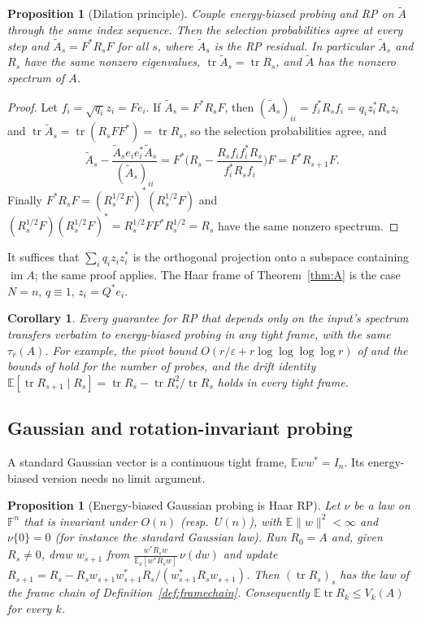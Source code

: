 \documentclass[11pt,a4paper]{article}
\newtheorem{proposition}[theorem]{Proposition}
\newtheorem{corollary}[theorem]{Corollary}
\theoremstyle{definition}
\newcommand{\E}{\mathbb{E}}
\newcommand{\F}{\mathbb{F}}
\newcommand{\tr}{\operatorname{tr}}
\begin{document}
\begin{proposition}[Dilation principle]\label{prop:dilation}
Couple energy-biased probing and RP on $\widetilde A$ through the same index sequence. Then the selection probabilities agree at every step and $\widetilde A_s=F^*R_sF$ for all $s$, where $\widetilde A_s$ is the RP residual. In particular $\widetilde A_s$ and $R_s$ have the same nonzero eigenvalues, $\tr\widetilde A_s=\tr R_s$, and $\widetilde A$ has the nonzero spectrum of $A$.
\end{proposition}

\begin{proof}
Let $f_i=\sqrt{q_i}z_i=Fe_i$. If $\widetilde A_s=F^*R_sF$, then $(\widetilde A_s)_{ii}=f_i^*R_sf_i=q_iz_i^*R_sz_i$ and $\tr\widetilde A_s=\tr(R_sFF^*)=\tr R_s$, so the selection probabilities agree, and
\[
\widetilde A_s-\frac{\widetilde A_se_ie_i^*\widetilde A_s}{(\widetilde A_s)_{ii}}=F^*\Big(R_s-\frac{R_sf_if_i^*R_s}{f_i^*R_sf_i}\Big)F=F^*R_{s+1}F .
\]
Finally $F^*R_sF=(R_s^{1/2}F)^*(R_s^{1/2}F)$ and $(R_s^{1/2}F)(R_s^{1/2}F)^*=R_s^{1/2}FF^*R_s^{1/2}=R_s$ have the same nonzero spectrum.
\end{proof}

It suffices that $\sum_iq_iz_iz_i^*$ is the orthogonal projection onto a subspace containing $\operatorname{im}A$; the same proof applies. The Haar frame of Theorem~\ref{thm:A} is the case $N=n$, $q\equiv1$, $z_i=Q^*e_i$.

\begin{corollary}\label{cor:transfer}
Every guarantee for RP that depends only on the input's spectrum transfers verbatim to energy-biased probing in any tight frame, with the same $\tau_r(A)$. For example, the pivot bound $O(r/\varepsilon+r\log\log\log\log r)$ of \cite{IterLog} and the bounds of \cite{CETW} hold for the number of probes, and the drift identity $\E[\tr R_{s+1}\mid R_s]=\tr R_s-\tr R_s^2/\tr R_s$ holds in every tight frame.
\end{corollary}

\subsection{Gaussian and rotation-invariant probing}
A standard Gaussian vector is a continuous tight frame, $\E ww^*=I_n$. Its energy-biased version needs no limit argument.

\begin{proposition}[Energy-biased Gaussian probing is Haar RP]\label{prop:gaussprobe}
Let $\nu$ be a law on $\F^n$ that is invariant under $O(n)$ (resp.\ $U(n)$), with $\E\|w\|^2<\infty$ and $\nu\{0\}=0$ (for instance the standard Gaussian law). Run $R_0=A$ and, given $R_s\ne0$, draw $w_{s+1}$ from $\frac{w^*R_sw}{\E_\nu[w^*R_sw]}\,\nu(dw)$ and update $R_{s+1}=R_s-R_sw_{s+1}w_{s+1}^*R_s/(w_{s+1}^*R_sw_{s+1})$. Then $(\tr R_s)_s$ has the law of the frame chain of Definition~\ref{def:framechain}. Consequently $\E\tr R_k\le V_k(A)$ for every $k$.
\end{proposition}
\end{document}
